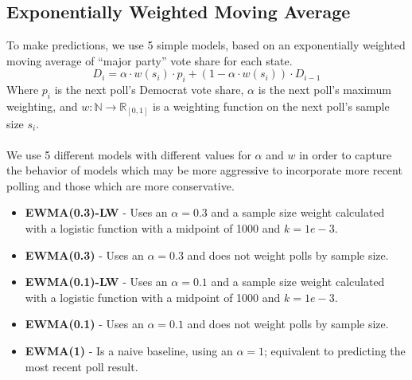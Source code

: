 \subsection{Exponentially Weighted Moving Average}
To make predictions, we use 5 simple models, based on an exponentially weighted moving average of ``major party'' vote share for each state.
$$
D_i = \alpha\cdot w(s_i) \cdot p_{i} + (1-\alpha\cdot w(s_i)) \cdot D_{i-1}
$$
Where $p_i$ is the next poll's Democrat vote share, $\alpha$ is the next poll's maximum weighting, and $w: \mathbb{N} \rightarrow \mathbb{R}_{[0, 1]}$ is a weighting function on the next poll's sample size $s_i$.
\\~\\
We use 5 different models with different values for $\alpha$ and $w$ in order to capture the behavior of models which may be more aggressive to incorporate more recent polling and those which are more conservative. 

\begin{itemize}
    \item {\bf EWMA(0.3)-LW} - Uses an $\alpha = 0.3$ and a sample size weight calculated with a logistic function with a midpoint of 1000 and $k=1e-3$.
    \item {\bf EWMA(0.3)} - Uses an $\alpha = 0.3$ and does not weight polls by sample size.
    \item {\bf EWMA(0.1)-LW} - Uses an $\alpha = 0.1$ and a sample size weight calculated with a logistic function with a midpoint of 1000 and $k=1e-3$.
    \item {\bf EWMA(0.1)} - Uses an $\alpha = 0.1$ and does not weight polls by sample size.
    \item {\bf EWMA(1)} - Is a naive baseline, using an $\alpha = 1$; equivalent to predicting the most recent poll result.
\end{itemize}



